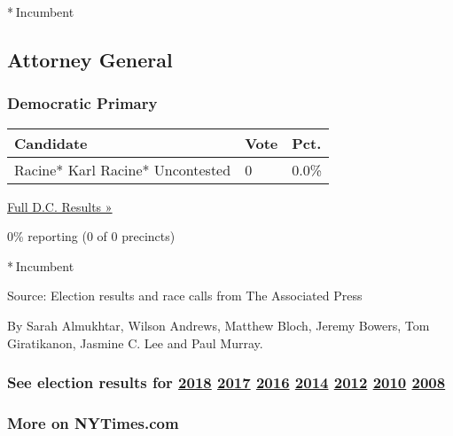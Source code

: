 * Incumbent

\hypertarget{attorney-general}{%
\subsection{Attorney General}\label{attorney-general}}

\hypertarget{democratic-primary-5}{%
\subsubsection{Democratic Primary}\label{democratic-primary-5}}

\begin{longtable}[]{@{}lll@{}}
\toprule
Candidate & Vote & Pct.\tabularnewline
\midrule
\endhead
 Racine* Karl Racine* Uncontested & 0 & 0.0\%\tabularnewline
\bottomrule
\end{longtable}

\href{https://www.nytimes3xbfgragh.onion/elections/results/district-of-columbia}{Full
D.C. Results »}

0\% reporting (0 of 0 precincts)

* Incumbent

Source: Election results and race calls from The Associated Press

By Sarah Almukhtar, Wilson Andrews, Matthew Bloch, Jeremy Bowers, Tom
Giratikanon, Jasmine C. Lee and Paul Murray.

\hypertarget{see-election-results-for-2018-2017-2016-2014-2012-2010-2008}{%
\subsubsection{\texorpdfstring{See election results for
\href{https://www.nytimes3xbfgragh.onion/interactive/2018/us/elections/calendar-primary-results.html}{2018}
\href{https://www.nytimes3xbfgragh.onion/interactive/2017/us/elections/election-calendar.html}{2017}
\href{https://www.nytimes3xbfgragh.onion/elections/results/president}{2016}
\href{https://www.nytimes3xbfgragh.onion/elections/2014/results/senate}{2014}
\href{https://www.nytimes3xbfgragh.onion/elections/2012/results/president.html}{2012}
\href{https://www.nytimes3xbfgragh.onion/elections/2010/results/senate.html}{2010}
\href{https://www.nytimes3xbfgragh.onion/elections/2008/results/president/map.html}{2008}}{See election results for 2018 2017 2016 2014 2012 2010 2008}}\label{see-election-results-for-2018-2017-2016-2014-2012-2010-2008}}

\hypertarget{more-on-nytimescom}{%
\subsubsection{More on NYTimes.com}\label{more-on-nytimescom}}

